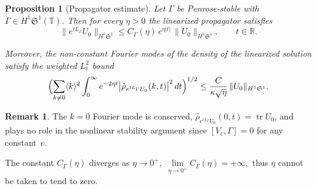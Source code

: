 \documentclass[11pt]{amsart}
\newtheorem{proposition}[theorem]{Proposition}
\theoremstyle{definition}
\newtheorem{remark}[theorem]{Remark}
\newcommand{\R}{\mathbb{R}}
\newcommand{\T}{\mathbb{T}}
\newcommand{\Sp}{\mathfrak{S}}
\DeclareMathOperator{\tr}{tr}
\begin{document}
\begin{proposition}[Propagator estimate]
\label{prop:propagator}
Let $\Gamma$ be Penrose-stable with $\Gamma\in H^1\Sp^1(\T).$ Then for every $\eta>0$ the linearized propagator satisfies
\begin{equation}\label{eq:propagator_bound}
  \|e^{tL_\Gamma}U_0\|_{H^1\Sp^1}
  \le C_\Gamma(\eta)\,e^{\eta|t|}\,
  \|U_0\|_{H^1\Sp^1},
  \qquad t\in\R.
\end{equation}

Moreover, the non-constant Fourier modes of the density of the linearized solution satisfy the weighted $L^2_t$ bound
\begin{equation}\label{eq:density_propagator}
  \Bigl(\sum_{k\ne 0}\langle k\rangle^2
  \int_0^\infty e^{-2\eta t}
  \bigl|\hat\rho_{e^{tL_\Gamma}U_0}(k,t)\bigr|^2\,dt
  \Bigr)^{1/2}
  \le \frac{C}{\kappa\sqrt{\eta}}\,
  \|U_0\|_{H^1\Sp^1}.
\end{equation}
\end{proposition}

\begin{remark}
The $k=0$ Fourier mode is conserved, $\hat\rho_{e^{tL_\Gamma}U_0}(0,t)=\tr U_0$, and plays no role in the nonlinear stability argument since $[V_c,\Gamma]=0$ for any constant~$c$.

The constant $C_\Gamma(\eta)$ diverges as $\eta\to 0^+,$ $\lim\limits_{\eta\to0^+} C_\Gamma(\eta) = +\infty,$ thus $\eta$ cannot be taken to tend to zero.
\end{remark}
\end{document}
